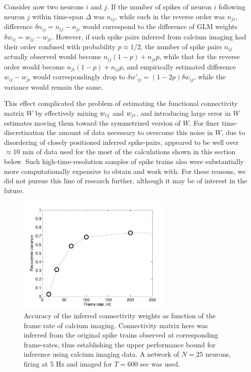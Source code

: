 Consider now two neurons $i$ and $j$. If the number of spikes of neuron $i$ following neuron $j$ within time-span $\Delta$ was $n_{ij}$, while such in the reverse order was $n_{ji}$, difference $\delta n_{ij} = n_{ij}-n_{ji}$ would correspond to the difference of GLM weights $\delta w_{ij}=w_{ij}-w_{ji}$. However, if such spike pairs inferred from calcium imaging had their order confused with probability $p\approx 1/2$, the number of spike pairs $n_{ij}$ actually observed would become $n_{ij}(1-p)+n_{ji}p$, while that for the reverse order would become $n_{ji}(1-p)+n_{ij}p$, and empirically estimated difference $w_{ij}-w_{ji}$ would correspondingly drop to $\delta w'_{ij}= (1-2p)\delta w_{ij}$, while the variance would remain the same. 

This effect complicated the problem of estimating the functional connectivity matrix $W$ by effectively mixing $w_{ij}$ and $w_{ji}$, and introducing large error in $W$ estimates moving them toward the symmetrized version of $W$.
For finer time-discretization the amount of data necessary to overcome this noise in $W$, due to disordering of closely positioned inferred spike-pairs, appeared to be well over $\approx 10$ min of data used for the most of the calculations shown in this section below. Such high-time-resolution samples of spike trains also were substantially more computationally expensive to obtain and work with. For these reasons, we did not pursue this line of research further, although it may be of interest in the future.


%
%
%
\begin{figure}[h]
\centering
\includegraphics[width=3in]{../figs/FigureA5_recvar}
\caption{Accuracy of the inferred connectivity weights as function of the frame rate of calcium imaging. Connectivity matrix here was inferred from the original spike trains observed at corresponding frame-rates, thus establishing the upper performance bound for inference using calcium imaging data. A network of $N=25$ neurons, firing at 5 Hz and imaged for $T=600$ sec was used.}
\label{fig:recvar}
\end{figure}

